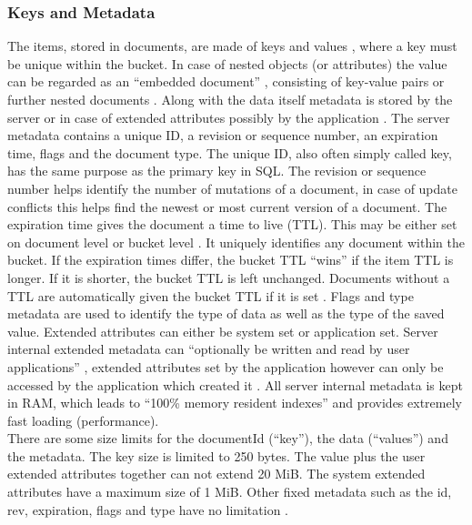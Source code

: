 \subsubsection{Keys and Metadata}
The items, stored in documents, are made of keys and values \parencite{couchbaseDocuData}, where a key must be unique within the bucket. In case of nested objects (or attributes) the value can be regarded as an “embedded document” \parencite{couchbaseDocuData}, consisting of key-value pairs or further nested documents \parencite{couchbaseDocuData}. 
Along with the data itself metadata is stored by the server \parencite{couchbaseDocuData} \parencite{objelean} or in case of extended attributes possibly by the application \parencite{couchbaseDocuData}. The server metadata contains a unique ID, a revision or sequence number, an expiration time, flags and the document type\parencite{couchbaseDocuData}. The unique ID, also often simply called key, has the same purpose as the primary key in SQL. The revision or sequence number helps identify the number of mutations of a document, in case of update conflicts this helps find the newest or most current version of a document. The expiration time gives the document a time to live (TTL). This may be either set on document level or bucket level \parencite{couchbaseDocuMemory}. It uniquely identifies any document within the bucket. If the expiration times differ, the bucket TTL \enquote{wins} if the item TTL is longer. If it is shorter, the bucket TTL is left unchanged. Documents without a TTL are automatically given the bucket TTL if it is set \parencite{couchbaseDocuExpiration}. Flags and type metadata are used to identify the type of data as well as the type of the saved value. Extended attributes can either be system set or application set. Server internal extended metadata can “optionally be written and read by user applications” \parencite{couchbaseDocuData}, extended attributes set by the application however can only be accessed by the application which created it \parencite{couchbaseDocuExtendedAttributes}. All server internal metadata is kept in RAM, which leads to “100\% memory resident indexes” \parencite{couchbaseWeb} and provides extremely fast loading (performance).\\
There are some size limits for the documentId (\enquote{key}), the data (\enquote{values}) and the metadata. The key size is limited to 250 bytes. The value plus the user extended attributes together can not extend 20 MiB. The system extended attributes have a maximum size of 1 MiB. Other fixed metadata such as the id, rev, expiration, flags and type have no limitation \parencite{couchbaseDocuData}.
